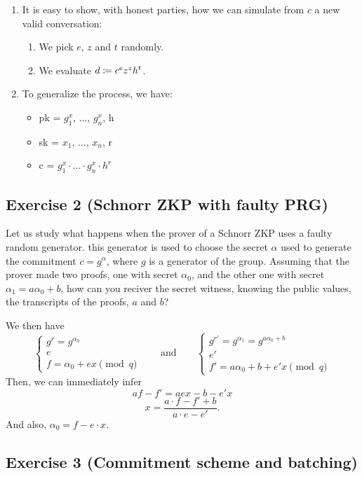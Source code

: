 \begin{solution}
\begin{enumerate}
		\item It is easy to show, with honest parties, how we can simulate from $c$ a new valid conversation:
		\begin{enumerate}
			\item We pick $e$, $z$ and $t$ randomly.
			\item We evaluate $d \coloneqq c^e z^z h^t$.
		\end{enumerate}

		\item To generalize the process, we have:
		\begin{itemize}
			\item pk = $g^x_1$, ..., $g^x_n$, h
			\item sk = $x_1$, ..., $x_n$, r
			\item c = $g^x_1 \cdot ... \cdot g^x_n \cdot h^r$
		\end{itemize}
	\end{enumerate}
\end{solution}



\subsection{Exercise 2 (Schnorr ZKP with faulty PRG)}

Let us study what happens when the prover of a Schnorr ZKP uses a faulty random generator. this generator is used to choose the secret $\alpha$ used to generate the commitment $c=g^\alpha$, where $g$ is a generator of the group. Assuming that the prover made two proofs, one with secret $\alpha_0$, and the other one with secret $\alpha_1=a \alpha_0 + b$, how can you reciver the secret witness, knowing the public values, the transcripts of the proofs, $a$ and $b$?


\begin{solution}
	We then have
	\[ \begin{cases} g^r = g^{\alpha_0} \\ e \\ f = \alpha_0 + ex \pmod q \end{cases} \qquad \text{and} \qquad \begin{cases} g^{r'} = g^{\alpha_1}=g^{a\alpha_0+b} \\ e' \\ f' = a \alpha_0 + b + e'x \pmod q \end{cases} \]
	Then, we can immediately infer
	\[af-f' = aex - b - e'x\]
	\[x=\frac{a\cdot f-f'+b}{a\cdot e-e'}.\]
	And also, $\alpha_0=f-e\cdot x$.
\end{solution}



\subsection{Exercise 3 (Commitment scheme and batching)}


